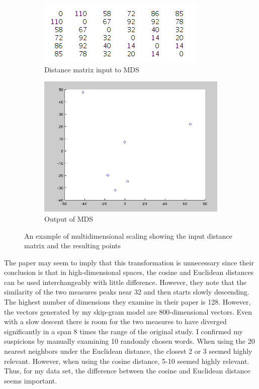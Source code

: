 \documentclass[eric_thesis.tex]{subfiles}
\begin{document}
\begin{figure}[tbp]
    \begin{subfigure}{.5\textwidth}
        \centering
        \includegraphics[width=.8\linewidth]{mds_example_input_matrix}
        \caption{Distance matrix input to MDS}
    \end{subfigure}
    \begin{subfigure}{.5\textwidth}
        \centering
        \includegraphics[width=.8\linewidth]{mds_example_output_plot}
        \caption{Output of MDS}
    \end{subfigure}

    \caption{An example of multidimensional scaling showing the input distance
    matrix and the resulting points}
    \label{fig:mdsexample}
\end{figure}


The paper \citep{Qian2004} may seem to imply that this 
transformation is unnecessary since their conclusion is that in high-dimensional 
spaces, the cosine and Euclidean distances can be used interchangeably with 
little difference. However, they note that the similarity of the two measures 
peaks near 32 and then starts slowly 
descending. The highest number of dimensions they examine in their paper is 128. 
However, the vectors generated by my skip-gram model are 800-dimensional 
vectors. Even with a slow descent there is room for the two measures to have 
diverged significantly in a span 8 times the range of the original study. I 
confirmed my suspicions by manually examining 10 randomly chosen words. When 
using the 20 nearest neighbors under the Euclidean distance, the closest 2 or 3 
seemed highly relevant. However, when using the cosine distance, 5-10 seemed 
highly relevant. Thus, for my data set, the difference between the cosine and 
Euclidean distance seems important. 
\end{document}

